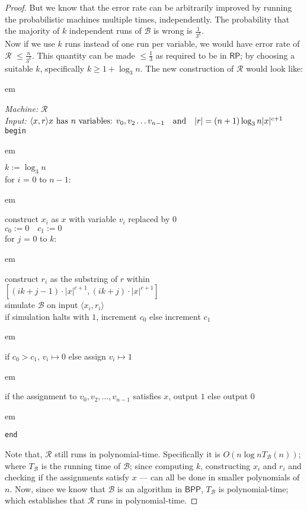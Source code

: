 \documentclass[usletter]{article}
\newcommand {\machine}[1]      {\ensuremath{\mathscr{#1}}}
\newcommand {\family}[1]       {\ensuremath{\mathsf{#1}}}
\newcommand {\indpar}[1]   {
  \par\leftskip=#1em
  \noindent\ignorespaces
}
\newenvironment{turing}[2] {
  \smallskip
  \indpar{2}
  \textit{Machine:} #1\\
  \textit{Input:} $#2$\\[5pt]
  \texttt{begin}
  \parskip=0pt
  \indpar{3}
}{
  \indpar{2}
  \texttt{end}
  \par\medskip
}
\newcommand {\RP}     {\family{RP}}
\newcommand {\BPP}    {\family{BPP}}
\begin{document}
\begin{enumerate}[labelsep=2.5em, label=\textbf{\arabic{enumi}}]
\begin{proof}
    But we know that the error rate can be arbitrarily improved by running the
    probabilistic machines multiple times, independently. The probability that
    the majority of $k$ independent runs of \machine{B} is wrong is
    $\frac{1}{3^k}$. \\
    Now if we use $k$ runs instead of one run per variable, we would have error
    rate of \machine{R} $\leq \frac{n}{3^k}$. This quantity can be made
    $\leq \frac{1}{3}$ as required to be in \RP; by choosing a suitable $k$,
    specifically $k \geq 1 + \log_3{n}$. The new construction of \machine{R}
    would look like:
    \begin{turing}
          {\machine{R}}
          {\langle x, r \rangle
            \hfill x \text{ has } n \text{ variables: } v_0, v_2 \ldots v_{n-1}
            \quad \text{and} \quad |r| = (n+1)\log_3{n}|x|^{c+1}}
      $k := \log_3{n}$ \\
      for $i$ = $0$ to $n-1$:
        \indpar{4}
        construct $x_i$ as $x$ with variable $v_i$ replaced by $0$ \\
        $c_0 := 0 \quad c_1 := 0$ \\
        for $j$ = $0$ to $k$:
          \indpar{5}
          construct $r_i$ as the substring of $r$ within
            $[(ik+j-1) \cdot |x|^{c+1}, (ik+j) \cdot |x|^{c+1}]$ \\
          simulate \machine{B} on input $\langle x_i, r_i \rangle$ \\
          if simulation halts with $1$, increment $c_0$ else increment $c_1$
        \indpar{4}
        if $c_0 > c_1$, $v_i \mapsto 0$ else assign $v_i \mapsto 1$
      \indpar{3}
      if the assignment to $v_0, v_2, \ldots , v_{n-1}$ satisfies $x$,
        output $1$ else output $0$
    \end{turing}

    Note that, \machine{R} still runs in polynomial-time. Specifically it is
    $O(n\log{n}T_\machine{B}(n))$; where $T_\machine{B}$ is the running time of
    \machine{B}; since computing $k$, constructing $x_i$ and $r_i$ and checking
    if the assignments satisfy $x$ --- can all be done in smaller polynomials of
    $n$. Now, since we know that \machine{B} is an algorithm in \BPP,
    $T_\machine{B}$ is polynomial-time; which establishes that \machine{R} runs
    in polynomial-time.


\end{proof}
\end{enumerate}
\end{document}

